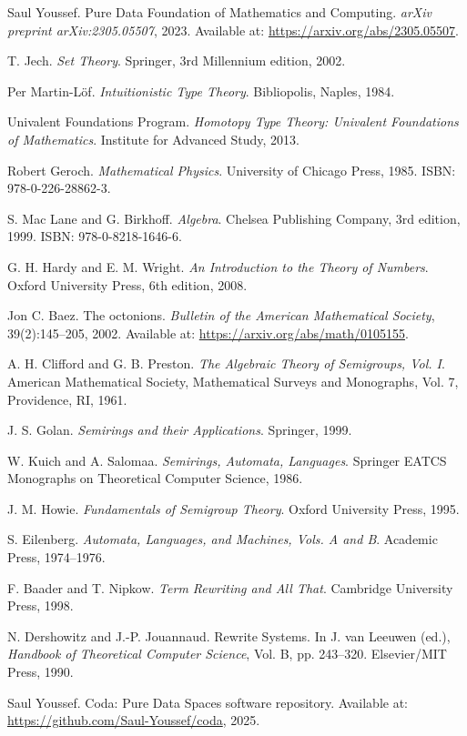 \documentclass[11pt]{article}
\begin{document}
\clearpage 
\begin{thebibliography}{99}

Saul Youssef.
\newblock Pure Data Foundation of Mathematics and Computing.
\newblock \emph{arXiv preprint arXiv:2305.05507}, 2023.
Available at: \url{https://arxiv.org/abs/2305.05507}.

T. Jech.
\newblock \emph{Set Theory}.
\newblock Springer, 3rd Millennium edition, 2002.

Per Martin-Löf.
\newblock \emph{Intuitionistic Type Theory}.
\newblock Bibliopolis, Naples, 1984.

Univalent Foundations Program.
\newblock \emph{Homotopy Type Theory: Univalent Foundations of Mathematics}.
\newblock Institute for Advanced Study, 2013.

Robert Geroch.
\newblock \emph{Mathematical Physics}.
\newblock University of Chicago Press, 1985. ISBN: 978-0-226-28862-3.

S. Mac Lane and G. Birkhoff.
\newblock \emph{Algebra}.
\newblock Chelsea Publishing Company, 3rd edition, 1999. ISBN: 978-0-8218-1646-6.

G. H. Hardy and E. M. Wright.
\newblock \emph{An Introduction to the Theory of Numbers}.
\newblock Oxford University Press, 6th edition, 2008.

Jon C. Baez.
\newblock The octonions.
\newblock \emph{Bulletin of the American Mathematical Society}, 39(2):145–205, 2002.
Available at: \url{https://arxiv.org/abs/math/0105155}.

A. H. Clifford and G. B. Preston.
\newblock \emph{The Algebraic Theory of Semigroups, Vol. I}.
\newblock American Mathematical Society, Mathematical Surveys and Monographs, Vol. 7, Providence, RI, 1961.

J. S. Golan.
\newblock \emph{Semirings and their Applications}.
\newblock Springer, 1999.

W. Kuich and A. Salomaa.
\newblock \emph{Semirings, Automata, Languages}.
\newblock Springer EATCS Monographs on Theoretical Computer Science, 1986.

J. M. Howie.
\newblock \emph{Fundamentals of Semigroup Theory}.
\newblock Oxford University Press, 1995.

S. Eilenberg.
\newblock \emph{Automata, Languages, and Machines, Vols. A and B}.
\newblock Academic Press, 1974–1976.

F. Baader and T. Nipkow.
\newblock \emph{Term Rewriting and All That}.
\newblock Cambridge University Press, 1998.

N. Dershowitz and J.-P. Jouannaud.
\newblock Rewrite Systems.
\newblock In J. van Leeuwen (ed.), \emph{Handbook of Theoretical Computer Science}, Vol. B, pp. 243–320.
Elsevier/MIT Press, 1990.

Saul Youssef.
\newblock Coda: Pure Data Spaces software repository.
\newblock Available at: \url{https://github.com/Saul-Youssef/coda}, 2025.

\end{thebibliography}

\end{document}
